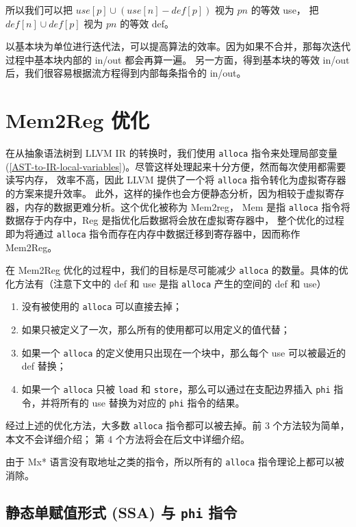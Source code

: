 所以我们可以把 $\mathit{use}[p] \cup (\mathit{use}[n] - \mathit{def}[p])$ 视为 $pn$ 的等效 use，
把 $\mathit{def}[n] \cup \mathit{def}[p]$ 视为 $pn$ 的等效 def。

以基本块为单位进行迭代法，可以提高算法的效率。因为如果不合并，那每次迭代过程中基本块内部的 in/out 都会再算一遍。
另一方面，得到基本块的等效 in/out 后，我们很容易根据流方程得到内部每条指令的 in/out。

\section{Mem2Reg 优化}\label{mem2reg}

在从抽象语法树到 LLVM IR 的转换时，我们使用 \texttt{alloca} 指令来处理局部变量
(\ref{AST-to-IR-local-variables})。尽管这样处理起来十分方便，然而每次使用都需要读写内存，
效率不高，因此 LLVM 提供了一个将 \texttt{alloca} 指令转化为虚拟寄存器的方案来提升效率。
此外，这样的操作也会方便静态分析，因为相较于虚拟寄存器，内存的数据更难分析。这个优化被称为 Mem2reg，
Mem 是指 \texttt{alloca} 指令将数据存于内存中，Reg 是指优化后数据将会放在虚拟寄存器中，
整个优化的过程即为将通过 \texttt{alloca} 指令而存在内存中数据迁移到寄存器中，因而称作 Mem2Reg。

在 Mem2Reg 优化的过程中，我们的目标是尽可能减少 \texttt{alloca} 的数量。具体的优化方法有（注意下文中的 def 和
use 是指 \texttt{alloca} 产生的空间的 def 和 use）
\begin{enumerate}
    \item 没有被使用的 \texttt{alloca} 可以直接去掉；
    \item 如果只被定义了一次，那么所有的使用都可以用定义的值代替；
    \item 如果一个 \texttt{alloca} 的定义使用只出现在一个块中，那么每个 use 可以被最近的 def 替换；
    \item 如果一个 \texttt{alloca} 只被 \texttt{load} 和 \texttt{store}，那么可以通过在支配边界插入
        \texttt{phi} 指令，并将所有的 use 替换为对应的 \texttt{phi} 指令的结果。
\end{enumerate}
经过上述的优化方法，大多数 \texttt{alloca} 指令都可以被去掉。前 3 个方法较为简单，本文不会详细介绍；
第 4 个方法将会在后文中详细介绍。

由于 Mx* 语言没有取地址之类的指令，所以所有的 \texttt{alloca} 指令理论上都可以被消除。

\subsection{静态单赋值形式 (SSA) 与 \texttt{phi} 指令}

